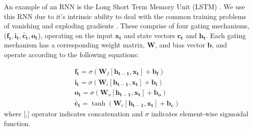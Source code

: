 

An example of an RNN is the Long Short Term Memory Unit (LSTM) \citep{hochreiter_long_1997}. We use this RNN due to it's intrinsic ability to deal with the common training problems of vanishing and exploding gradients 
\citep{bengio_learning_1994}. These comprise of four gating mechanisms, ($\mathbf{f_t}, \mathbf{i_t},\mathbf{\tilde{c_t}}, \mathbf{o_t}$), operating on the input $\mathbf{x_t}$ and state vectors $\mathbf{c_t}$ and $\mathbf{h_t}$. 
Each gating mechanism has a corresponding weight matrix, $\mathbf{W}$, and bias vector $\mathbf{b}$, and operate according to the following equations:

\begin{align}
    \mathbf{f_t} = \sigma(\mathbf{W}_f [\mathbf{h_{t-1}}, \mathbf{x_t}] + \mathbf{b_f})\label{eq:lstm1}\\
    \mathbf{i_t} = \sigma(\mathbf{W}_i [\mathbf{h_{t-1}}, \mathbf{x_t}] + \mathbf{b_i}) \label{eq:lstm2}\\
    \mathbf{o_t} = \sigma(\mathbf{W}_o [\mathbf{h_{t-1}}, \mathbf{x_t}] + \mathbf{b_o}) \label{eq:lstm3}\\
    \mathbf{\tilde{c_t}} = \tanh(\mathbf{W}_c [\mathbf{h_{t-1}}, \mathbf{x_t}] + \mathbf{b_c}) \label{eq:lstm4}
\end{align}
where [,] operator indicates concatenation and $\sigma$ indicates element-wise sigmoidal function.


